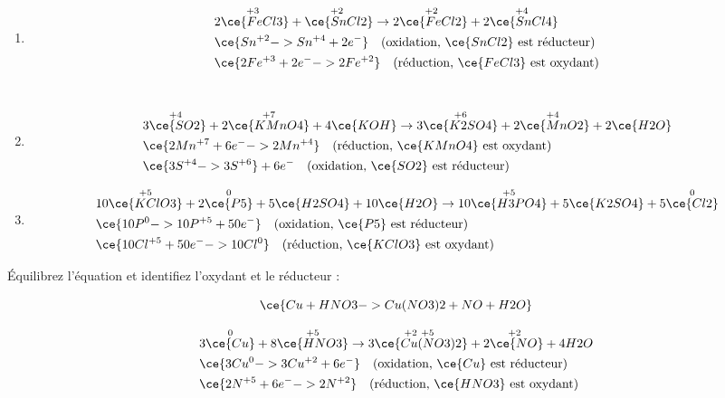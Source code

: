 \documentclass[
  11pt,
  a4paper,
  openany]{book}
\providecommand{\tightlist}{%
  \setlength{\itemsep}{0pt}\setlength{\parskip}{0pt}}
\begin{document}
\begin{Answer}

\begin{enumerate}
\def\labelenumi{\alph{enumi}.}
\tightlist
\item
  \[
  \begin{split}
  & 2 \overset{+3\ }{\ce{FeCl3}} + \overset{+2\ }{\ce{SnCl2}} \rightarrow 2 \overset{+2\ }{\ce{FeCl2}} + 2 \overset{+4\ }{\ce{SnCl4}} \\
  & \ce{ Sn^{+2} -> Sn^{+4} + 2 e^-} \quad \text{(oxidation, $\ce{SnCl2}$ est réducteur)} \\
  & \ce{ 2 Fe^{+3} + 2 e^- -> 2 Fe^{+2}} \quad \text{(réduction, $\ce{FeCl3}$ est oxydant)}
  \end{split}
  \]\\
\item
  \[
  \begin{split}
  & 3 \overset{+4\ }{\ce{SO2}} + 2 \overset{+7}{\ce{KMnO4}} + 4 \ce{KOH} \rightarrow 3 \overset{+6}{\ce{K2SO4}} + 2 \overset{+4\ }{\ce{MnO2}} + 2 \ce{H2O} \\
  & \ce{ 2 Mn^{+7} + 6e^- -> 2 Mn^{+4}} \quad \text{(réduction, $\ce{KMnO4}$ est oxydant)} \\
  & \ce{ 3 S^{+4} -> 3 S^{+6}} + 6e^- \quad \text{(oxidation, $\ce{SO2}$ est réducteur)}
  \end{split}
  \]
\item
  \[
  \begin{split}
  & 10 \overset{+5}{\ce{KClO3}} + 2 \overset{0}{\ce{P5}} + 5 \ce{H2SO4} + 10 \ce{H2O} \rightarrow 10 \overset{+5}{\ce{H3PO4}} + 5 \ce{K2SO4} + 5 \overset{0}{\ce{Cl2}} \\
  & \ce{ 10 P^{0} -> 10 P^{+5} + 50 e^-} \quad \text{(oxidation, $\ce{P5}$ est réducteur)} \\
  & \ce{ 10 Cl^{+5} + 50 e^- -> 10 Cl^{0}} \quad \text{(réduction, $\ce{KClO3}$ est oxydant)}
  \end{split}
  \]
\end{enumerate}

\end{Answer}

\begin{Exercise}
Équilibrez l'équation et identifiez l'oxydant et le réducteur :

\[
\ce{ Cu + HNO3 -> Cu(NO3)2 + NO + H2O}
\]

\end{Exercise}

\begin{Answer}
\[
\begin{split}
& 3 \overset{0}{\ce{Cu}} + 8 \overset{+5}{\ce{HNO3}} \rightarrow 3 \overset{+2\ +5\ }{\ce{Cu(NO3)2}} + 2 \overset{+2\ }{\ce{NO}} + 4 H2O \\
& \ce{ 3 Cu^{0} -> 3 Cu^{+2} + 6 e^-} \quad \text{(oxidation, $\ce{Cu}$ est réducteur)} \\
& \ce{ 2 N^{+5} + 6 e^- -> 2 N^{+2}} \quad \text{(réduction, $\ce{HNO3}$ est oxydant)}
\end{split}
\]

\end{Answer}
\end{document}
